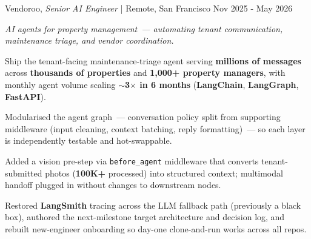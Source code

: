 \begin{cventries2}

  \cventrynew
    {Vendoroo, \textnormal{\textit{Senior AI Engineer} | Remote, San Francisco}}
    {Nov 2025 - May 2026}
    {
      {\small\itshape AI agents for property management~--- automating tenant communication, maintenance triage, and vendor coordination.}\par\vspace{4mm}
      \begin{cvitems}
        \item Ship the tenant-facing maintenance-triage agent serving {\bf millions of messages} across {\bf thousands of properties} and {\bf 1{,}000+ property managers}, with monthly agent volume scaling {\bf $\sim$3$\times$ in 6 months} ({\bf LangChain}, {\bf LangGraph}, {\bf FastAPI}).
        \item Modularised the agent graph~--- conversation policy split from supporting middleware (input cleaning, context batching, reply formatting)~--- so each layer is independently testable and hot-swappable.
        \item Added a vision pre-step via \texttt{before\_agent} middleware that converts tenant-submitted photos ({\bf 100K+} processed) into structured context; multimodal handoff plugged in without changes to downstream nodes.
        \item Restored {\bf LangSmith} tracing across the LLM fallback path (previously a black box), authored the next-milestone target architecture and decision log, and rebuilt new-engineer onboarding so day-one clone-and-run works across all repos.
      \end{cvitems}
    }


\end{cventries2}
